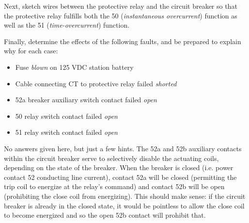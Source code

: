 
\vskip 10pt

Next, sketch wires between the protective relay and the circuit breaker so that the protective relay fulfills both the 50 ({\it instantaneous overcurrent}) function as well as the 51 ({\it time-overcurrent}) function.

\vskip 10pt

Finally, determine the effects of the following faults, and be prepared to explain why for each case:

\begin{itemize}
\item{} Fuse {\it blown} on 125 VDC station battery
\item{} Cable connecting CT to protective relay failed {\it shorted}
\item{} 52a breaker auxiliary switch contact failed {\it open}
\item{} 50 relay switch contact failed {\it open}
\item{} 51 relay switch contact failed {\it open}
\end{itemize}

\vskip 10pt







No answers given here, but just a few hints.  The 52a and 52b auxiliary contacts within the circuit breaker serve to selectively disable the actuating coils, depending on the state of the breaker.  When the breaker is closed (i.e. power contact 52 conducting line current), contact 52a will be closed (permitting the trip coil to energize at the relay's command) and contact 52b will be open (prohibiting the close coil from energizing).  This should make sense: if the circuit breaker is already in the closed state, it would be pointless to allow the close coil to become energized and so the open 52b contact will prohibit that.
 





